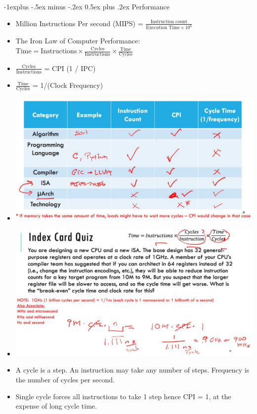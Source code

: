 \documentclass[8pt, landscape]{extarticle}
\makeatletter
\renewcommand{\subsection}{\@startsection{subsection}{2}{0mm}%
  {-1explus -.5ex minus -.2ex}%
  {0.5ex plus .2ex}%
{\normalfont\normalsize\bfseries}}
\makeatother
\begin{document}
\begin{multicols*}{4}
  \subsection{Performance}
  \begin{itemize}
    \item Million Instructions Per second (MIPS) = $\frac{\text{Instruction count}}{\text{Execution Time} \times 10^6}$
    \item The Iron Law of Computer Performance: $\text{Time} = \text{Instructions} \times \frac{\text{Cycles}}{\text{Instructions}} \times \frac{\text{Time}}{\text{Cycles}}$
    \item $\frac{\text{Cycles}}{\text{Instructions}}$ = CPI (1 / IPC)
    \item $\frac{\text{Time}}{\text{Cycles}}$ = 1/(Clock Frequency)
    \item \includegraphics[width=0.75\linewidth]{performance_influence}
    \item \includegraphics[width=0.75\linewidth]{performance_index_card_quiz}
    \item A cycle is a step. An instruction may take any number of steps. Frequency is the number of cycles per second.
    \item Single cycle forces all instructions to take 1 step hence CPI = 1, at the expense of long cycle time.
  \end{itemize}


\end{multicols*}
\end{document}

